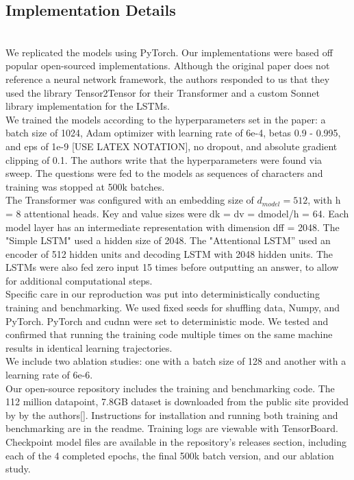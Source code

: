 \subsection{Implementation Details} \\

We replicated the models using PyTorch\supercite{paszke2019pytorch}. Our implementations were based off popular open-sourced implementations\supercite{nlp-tutorial}\supercite{pytorch_math_dataset}\supercite{attention-is-all-you-need}. Although the original paper does not reference a neural network framework, the authors responded to us that they used the library Tensor2Tensor\supercite{vaswani2018tensor2tensor} for their Transformer and a custom Sonnet\supercite{sonnet} library implementation for the LSTMs.\\

We trained the models according to the hyperparameters set in the paper: a batch size of 1024, Adam optimizer with learning rate of 6e-4, betas 0.9 - 0.995, and eps of 1e-9 [USE LATEX NOTATION], no dropout, and absolute gradient clipping of 0.1. The authors write that the hyperparameters were found via sweep. The questions were fed to the models as sequences of characters and training was stopped at 500k batches.\\

The Transformer was configured with an embedding size of $d_{model} = 512$, with h = 8 attentional heads. Key and value sizes were dk = dv = dmodel/h = 64. Each model layer has an intermediate representation with dimension dff = 2048. The "Simple LSTM" used a hidden size of 2048. The "Attentional LSTM” used an encoder of 512 hidden units and decoding LSTM with 2048 hidden units. The LSTMs were also fed zero input 15 times before outputting an answer, to allow for additional computational steps. \\

Specific care in our reproduction was put into deterministically conducting training and benchmarking. We used fixed seeds for shuffling data, Numpy, and PyTorch. PyTorch and cudnn were set to deterministic mode. We tested and confirmed that running the training code multiple times on the same machine results in identical learning trajectories. \\

We include two ablation studies: one with a batch size of 128 and another with a learning rate of 6e-6. \\

Our open-source repository\supercite{hs-math-nlp} includes the training and benchmarking code. The 112 million datapoint, 7.8GB dataset is downloaded from the public site provided by by the authors[]. Instructions for installation and running both training and benchmarking are in the readme. Training logs are viewable with TensorBoard. Checkpoint model files are available in the repository's releases section, including each of the 4 completed epochs, the final 500k batch version, and our ablation study. \\

